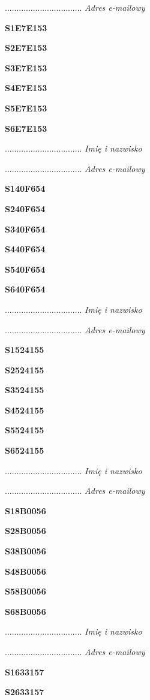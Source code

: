 .................................
\textit{Adres e-mailowy}

\Large \textbf{S1E7E153}

\Large \textbf{S2E7E153}

\Large \textbf{S3E7E153}

\Large \textbf{S4E7E153}

\Large \textbf{S5E7E153}

\Large \textbf{S6E7E153}

.................................
\textit{Imię i nazwisko}

.................................
\textit{Adres e-mailowy}

\Large \textbf{S140F654}

\Large \textbf{S240F654}

\Large \textbf{S340F654}

\Large \textbf{S440F654}

\Large \textbf{S540F654}

\Large \textbf{S640F654}

.................................
\textit{Imię i nazwisko}

.................................
\textit{Adres e-mailowy}

\Large \textbf{S1524155}

\Large \textbf{S2524155}

\Large \textbf{S3524155}

\Large \textbf{S4524155}

\Large \textbf{S5524155}

\Large \textbf{S6524155}

.................................
\textit{Imię i nazwisko}

.................................
\textit{Adres e-mailowy}

\Large \textbf{S18B0056}

\Large \textbf{S28B0056}

\Large \textbf{S38B0056}

\Large \textbf{S48B0056}

\Large \textbf{S58B0056}

\Large \textbf{S68B0056}

.................................
\textit{Imię i nazwisko}

.................................
\textit{Adres e-mailowy}

\Large \textbf{S1633157}

\Large \textbf{S2633157}

